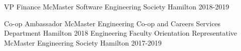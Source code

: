 



\begin{cvhonors}

  \cvhonor
    {VP Finance} 
    {McMaster Software Engineering Society} %
    {Hamilton} %
    {2018-2019} %

  \cvhonor
    {Co-op Ambassador} %
    {McMaster Engineering Co-op and Careers Services Department} %
    {Hamilton} %
    {2018} %
%
  \cvhonor
    {Engineering Faculty Orientation Representative} 
    {McMaster Engineering Society} %
    {Hamilton} %
    {2017-2019} %



\end{cvhonors}
